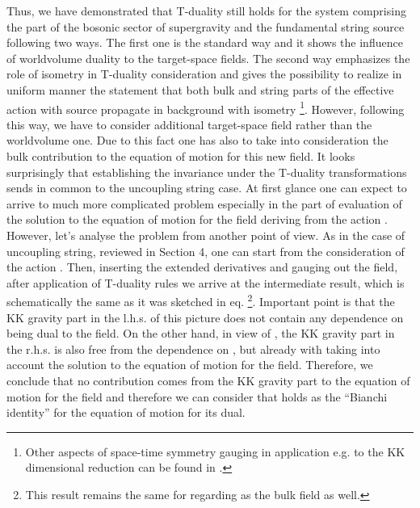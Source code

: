 \documentclass[a4paper,11pt]{article}
\begin{document}
Thus, we have demonstrated that T-duality still holds for the system comprising
the part of the bosonic sector of supergravity and the fundamental string 
source following two ways. The first one is the standard way and it shows the
influence of worldvolume duality to the target-space fields. The second way
emphasizes the role of isometry in T-duality consideration and gives the
possibility to realize in uniform manner the statement that both bulk and 
string parts of the
effective action with source propagate in background with isometry 
\footnote{Other aspects of space-time symmetry gauging in application e.g. to
the KK dimensional reduction can be found in \cite{nur}.}. However, following 
this way, we have to consider additional
target-space field rather than the worldvolume one. Due to this fact one has
also to take into consideration the bulk contribution to the equation of motion
for this new field. 
It looks surprisingly that establishing the invariance under the 
T-duality transformations sends in common to the uncoupling string case. 
At first glance one can expect to arrive to much more complicated problem
especially in the part of evaluation of the solution to the equation
of motion for the \coordHE{} field deriving from the action . However, let's
analyse the problem from another point of view. As in the case of uncoupling
string, reviewed in Section 4, one can start from the consideration of the
action . Then, inserting the extended derivatives and gauging out
the \coordHE{} field, after application of T-duality rules we arrive at
the intermediate result, which is schematically the same as it was 
sketched in eq. 
\footnote{This result remains the same for regarding \coordHE{} as the bulk field
as well.}. Important point is that the KK gravity part in
the l.h.s. of this picture does not contain any dependence on 
\coordHE{} being dual to the \coordHE{} field. On the other
hand, in view of , the KK gravity part in the r.h.s. is also free from 
the dependence on \coordHE{}, but already with taking into 
account the solution to the equation of motion for the \coordHE{} field. Therefore, we
conclude that no contribution comes from the KK gravity part to the equation of
motion for the \coordHE{} field and therefore we can consider that \coordHE{} holds as
the ``Bianchi identity'' for the equation of motion for its dual.
\end{document}
